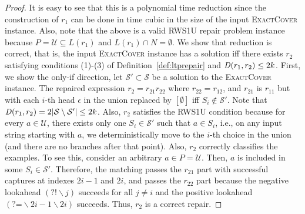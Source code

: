 \documentclass[conference]{IEEEtran}
\newcommand{\distfunc}{{\it D}}
\newcommand{\ltp}{RWS1U}
\begin{document}
\begin{proof}
It is easy to see that this is a polynomial time reduction since the construction of $r_1$ can be done in time cubic in the size of the input \textsc{ExactCover} instance.
Also, note that the above is a valid \ltp{} repair problem instance because $P = \mathcal{U} \subseteq L(r_1)$ and $L(r_1) \cap N = \emptyset$.
We show that reduction is correct, that is, the input \textsc{ExactCover} instance has a solution iff there exists $r_2$ satisfying conditions (1)-(3) of Definition~\ref{def:ltprepair} and $\distfunc{}(r_1, r_2) \leq 2k$.  First, we show the only-if direction, let $\mathcal{S'} \subset \mathcal{S}$ be a solution to the \textsc{ExactCover} instance.  The repaired expression $r_2 = r_{21} r_{22}$ where $r_{22} = r_{12}$, and 
$r_{21}$ is $r_{11}$ but with each $i$-th head $\epsilon$ in the union replaced by $[\emptyset]$ iff 
$S_i \notin \mathcal{S'}$.  Note that $\distfunc{}(r_1, r_2) = 2|\mathcal{S}\setminus\mathcal{S'}| \leq 2k$.  Also, $r_2$ satisfies the \ltp{} condition because for every $a \in \mathcal{U}$, there exists only one $S_i \in \mathcal{S'}$ such that $a \in S_i$, i.e., on any input string starting with $a$, we deterministically move to the $i$-th choice in the union (and there are no branches after that point).  Also, $r_2$ correctly classifies the examples.  To see this, consider an arbitrary $a \in P = \mathcal{U}$.  Then, $a$ is included in some $S_i \in \mathcal{S'}$.  Therefore, the matching passes the $r_{21}$ part with successful captures at indexes $2i-1$ and $2i$, and passes the $r_{22}$ part because the negative lookahead $(?!\backslash j)$ succeeds for all $j \neq i$ and the positive lookahead $(\mbox{?=}\backslash2i-1\backslash2i)$ succeeds.  Thus, $r_2$ is a correct repair.


\end{proof}
\end{document}
